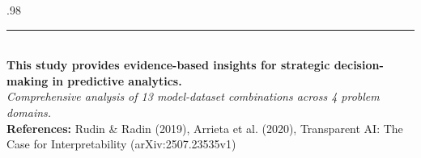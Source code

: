 \documentclass[final]{beamer}
\begin{document}
\begin{frame}[t]
\vspace{1cm}
\begin{columns}[t]
\begin{column}{.98\linewidth}
\centering
\rule{\linewidth}{2pt}\\[0.5cm]
{\large\textbf{This study provides evidence-based insights for strategic decision-making in predictive analytics.}\\[0.3cm]
\textit{Comprehensive analysis of 13 model-dataset combinations across 4 problem domains.}\\[0.5cm]
\textbf{References:} Rudin \& Radin (2019), Arrieta et al. (2020), Transparent AI: The Case for Interpretability (arXiv:2507.23535v1)\\[0.5cm]}
\end{column}
\end{columns}

\end{frame}
\end{document}
